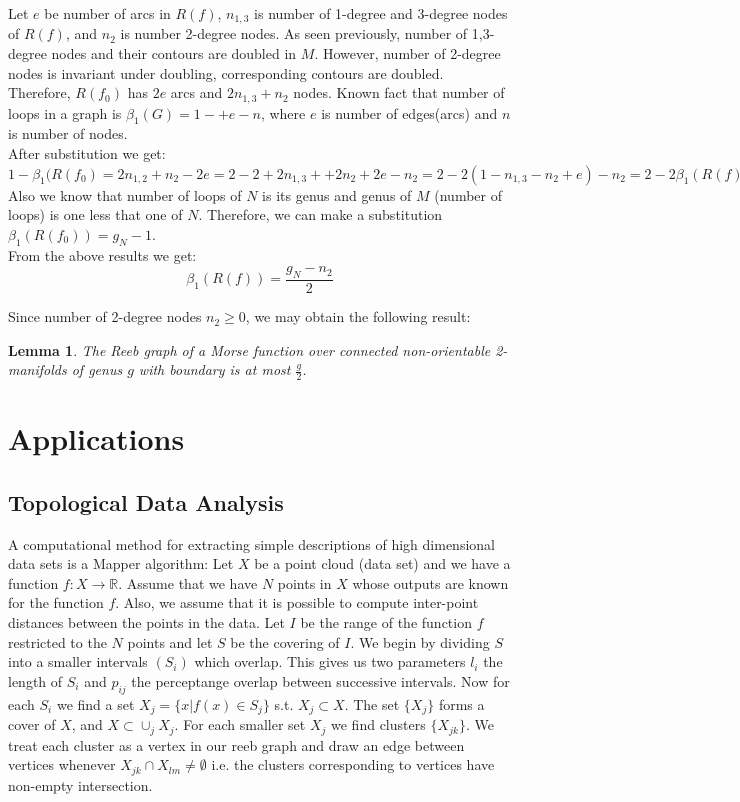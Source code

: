 \documentclass[]{article}
\newtheorem{lemma}{Lemma}
\newcommand{\R}{\mathbb{R}}
\begin{document}
Let $e$ be number of arcs in $R(f)$, $n_{1,3}$ is number of 1-degree and 3-degree nodes of $R(f)$, and $n_2$ is number 2-degree nodes. As seen previously, number of 1,3-degree nodes and their contours are doubled in $M$. However, number of 2-degree nodes is invariant under doubling, corresponding contours are doubled. \\

Therefore, $R(f_0)$ has $2e$ arcs and $2n_{1,3}+n_2$ nodes. Known fact that number of loops in a graph is $\beta_1 (G)=1-+e-n$, where $e$ is number of edges(arcs) and $n$ is number of nodes. \\
After substitution we get:
$1-\beta_1(R(f_0)=2n_{1,2}+n_2-2e=2-2+2n_{1,3}++2n_2+2e-n_2=2-2(1-n_{1,3}-n_2+e)-n_2=2-2\beta_1(R(f))-n_2$ 
\\
Also we know that number of loops of $N$ is its genus and genus of $M$ (number of loops) is one less that one of $N$. Therefore, we can make a substitution $\beta_1(R(f_0))=g_N-1$. \\
From the above results we get: 
\begin{equation}
\beta_1(R(f))=\frac{g_N-n_2}{2}
\end{equation}

Since number of 2-degree nodes $n_2\geq0 $, we may obtain the following result:
\begin{lemma}
The Reeb graph of a Morse function over connected non-orientable 2-manifolds of genus $g$ with boundary is at most $\frac{g}{2}$.
\end{lemma}

\section{Applications}
\subsection{Topological Data Analysis}
A computational method for extracting simple descriptions of high dimensional data sets is a Mapper algorithm:
Let $X$ be a point cloud (data set) and we have a function $f:X \to \R$.
Assume that we have $N$ points in $X$ whose outputs are known for the function $f$.
Also, we assume that it is possible to compute inter-point distances between the points in the data.
Let $I$ be the range of the function $f$ restricted to the $N$ points and let $S$ be the covering of $I$.
We begin by dividing $S$ into a smaller intervals $(S_i)$ which overlap.
This gives us two parameters $l_i$ the length of $S_i$ and $p_{ij}$ the perceptange overlap between successive intervals.
Now for each $S_i$ we find a set $X_j = \{x | f(x) \in S_j\}$ s.t. $X_j \subset X$. The set $\{X_j\}$ forms a cover of $X$, and $X \subset \cup_j X_j$.
For each smaller set $X_j$ we find clusters $\{X_{jk}\} $.
We treat each cluster as a vertex in our reeb graph and draw an edge between vertices whenever $X_{jk} \cap X_{lm} \neq \emptyset$ i.e. the clusters corresponding to vertices have non-empty intersection. \\
\end{document}

